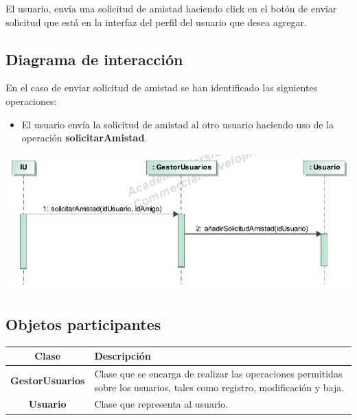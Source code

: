 \documentclass[12pt, a4paper, titlepage]{article}
\begin{document}
El usuario, envía una solicitud de amistad haciendo click en el botón de enviar solicitud que está en la interfaz del perfil del usuario que desea agregar.

\subsection{Diagrama de interacción}
En el caso de {\sc enviar solicitud de amistad } se han identificado las siguientes operaciones:

\begin{itemize}
	\item El usuario envía la solicitud de amistad al otro usuario haciendo uso de la operación \textbf{solicitarAmistad}.
\end{itemize}

\begin{center}
	\includegraphics{Imagenes/OperacionSolicitarAmistad}
\end{center}
\subsection{Objetos participantes}

\begin{center}

\begin{tabular}{|c|p{14cm}|}
	\hline
	\textbf{Clase} & \textbf{Descripción}\\ \hline
	\textbf{GestorUsuarios} &  Clase que se encarga de realizar las operaciones permitidas sobre los usuarios, tales como registro, modificación y baja.\\ \hline
	\textbf{Usuario} & Clase que representa al usuario. \\ \hline
\end{tabular}

\end{center}
\end{document}
